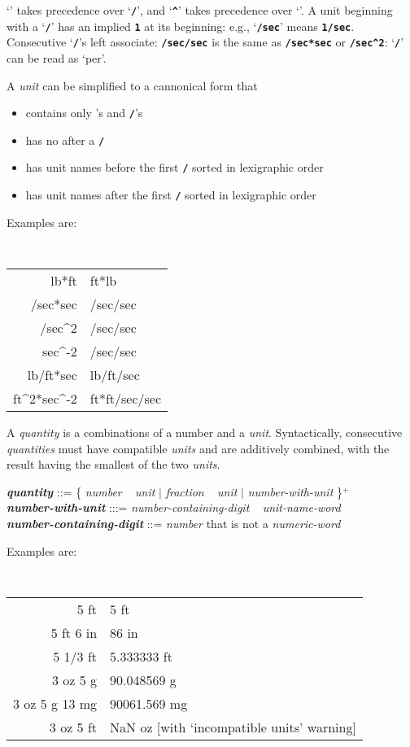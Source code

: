 \documentclass[12pt]{article}
\newcommand{\TT}[1]{{\tt \bfseries #1}}
\newcommand{\emkey}[1]{{\em \bfseries #1}}
\newcommand{\PLUS}[1][]{{$^{+#1}$}}
\newcommand{\CIRCUM}{\textasciicircum}
\newenvironment{indpar}[1][0.3in]%
	{\begin{list}{}%
		     {\setlength{\itemsep}{0in}%
		      \setlength{\topsep}{0in}%
		      \setlength{\parsep}{1ex}%
		      \setlength{\labelwidth}{#1}%
		      \setlength{\leftmargin}{#1}%
		      \addtolength{\leftmargin}{\labelsep}}%
	 \item}%
	{\end{list}}
\begin{document}
`\TT{*}' takes precedence over `\TT{/}', and `\TT{\CIRCUM}'
takes precedence over `\TT{*}'.
A unit beginning with a `\TT{/}' has an implied \TT{1}
at its beginning: e.g., `\TT{/sec}' means \TT{1/sec}.
Consecutive `\TT{/}'s left associate: \TT{/sec/sec} is the same
as \TT{/sec*sec} or \TT{/sec\CIRCUM 2}: `\TT{/}' can be read
as `per'.

A {\em unit} can be simplified to a cannonical form that
\begin{itemize}
\item contains only \TT{*}'s and \TT{/}'s
\item has no \TT{*} after a \TT{/}
\item has unit names before the first \TT{/} sorted in lexigraphic order
\item has unit names after the first \TT{/} sorted in lexigraphic order
\end{itemize}
Examples are:
\begin{center}
\tt
\begin{tabular}{r@{~$\Longrightarrow$~}l}
lb*ft & ft*lb \\
/sec*sec & /sec/sec \\
/sec\CIRCUM2 & /sec/sec \\
sec\CIRCUM-2 & /sec/sec \\
lb/ft*sec & lb/ft/sec \\
ft\CIRCUM2*sec\CIRCUM-2 & ft*ft/sec/sec
\end{tabular}
\end{center}

A {\em quantity} is a combinations of a number and a {\em unit}.
Syntactically, consecutive {\em quantities} must have compatible
{\em units} and are additively combined, with the result having the
smallest of the two {\em units}.
\begin{indpar}
\emkey{quantity} ::=
    \{ {\em number} ~ {\em unit}
       $|$ {\em fraction} ~ {\em unit}
       $|$ {\em number-with-unit} \}\PLUS{} \\
\emkey{number-with-unit}
    :::= {\em number-containing-digit} ~ {\em unit-name-word} \\
\emkey{number-containing-digit} ::= {\em number}
    that is not a {\em numeric-word}
\end{indpar}
Examples are:
\begin{center}
\tt
\begin{tabular}{r@{~$\Longrightarrow$~}l}
5 ft & 5 ft \\
5 ft 6 in & 86 in \\
5 1/3 ft & 5.333333 ft \\
3 oz 5 g & 90.048569 g \\
3 oz 5 g 13 mg & 90061.569 mg \\
3 oz 5 ft & NaN oz [with `incompatible units' warning] \\
\end{tabular}
\end{center}
\end{document}
